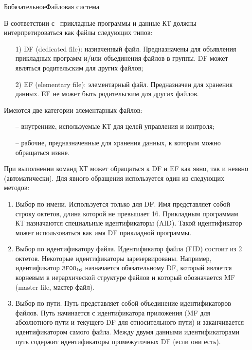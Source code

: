 \begin{appendix}{Б}{обязательное}{Файловая система}
\label{FILES}


В соответствии с~\cite{APDU} прикладные программы и данные КТ должны 
интерпретироваться как файлы следующих типов: 

\begin{enumerate}
\item[1)]
DF (dedicated file): назначенный файл. 
Предназначены для объявления прикладных программ и/или объединения файлов в 
группы. DF может являться родительским для других файлов;

\item[2)]
EF (elementary file): элементарный файл. Предназначен для хранения данных. 
EF не может быть родительским для других файлов.  
\end{enumerate}

Имеются две категории элементарных файлов:
\begin{itemize}
\item[--] 
внутренние, используемые КТ для целей управления и контроля;  
\item[--]
рабочие, предназначенные для хранения данных, к которым можно обращаться извне.
\end{itemize}                                                            
                  
При выполнении команд КТ может обращаться к DF и EF как явно, так и неявно 
(автоматически). Для явного обращения используется один из следующих 
методов: 
\begin{enumerate}
\item
Выбор по имени. Используется только для DF. Имя представляет собой строку 
октетов, длина которой не превышает 16. Прикладным программам КТ назначаются  
специальные идентификаторы (AID). Такой идентификатор может использоваться 
как имя DF прикладной программы. 

\item
Выбор по идентификатору файла. Идентификатор файла (FID) состоит из 2 октетов. 
Некоторые идентификаторы зарезервированы. Например, 
идентификатор $\texttt{3F00}_{16}$ назначается обязательному DF, 
который является корневым в иерархической структуре файлов и 
который обозначается MF (master file, мастер-файл). 

\item
Выбор по пути. Путь представляет собой объединение идентификаторов файлов. Путь 
начинается с идентификатора приложения (MF для абсолютного пути и текущего DF 
для относительного пути) и заканчивается идентификатором самого файла. Между 
двумя данными идентификаторами путь содержит идентификаторы промежуточных 
DF (если они есть). 


\end{enumerate}
\end{appendix}
